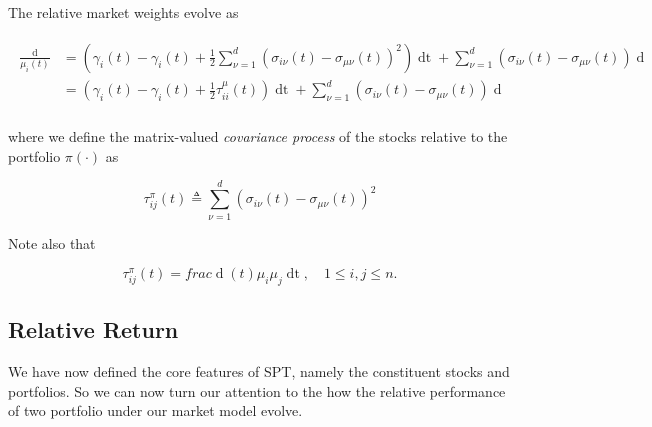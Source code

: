 \documentclass[british]{amsart} \usepackage{lmodern}
\numberwithin{equation}{section} \numberwithin{figure}{section}
\theoremstyle{plain} \newtheorem{thm}{\protect\theoremname}[section]
\theoremstyle{definition} \newtheorem{defn}[thm]{\protect\definitionname}
\theoremstyle{plain} \newtheorem{assumption}[thm]{\protect\assumptionname}
\theoremstyle{plain} \newtheorem{lem}[thm]{\protect\lemmaname}
\theoremstyle{plain} \newtheorem{prop}[thm]{\protect\propositionname}
\theoremstyle{remark} \newtheorem{rem}[thm]{\protect\remarkname}
\theoremstyle{plain} \newtheorem{cor}[thm]{\protect\corollaryname}
\renewcommand{\d}[1]{\mathop{\mathrm{d}{#1}}}
\newcommand{\defeq}{\mathop{\triangleq}} \newcommand{\almostsurely}{\text{a.s.}}
\begin{document}
The relative market weights evolve as

  \begin{gather} 
    \label{eq:relativemarketweights}
    \begin{split} 
      \frac{\d{\mu_{i}(t)}}{\mu_{i}(t)} &=
        \left(
         \gamma_{i}(t) - \gamma_{i}(t) + \frac{1}{2} 
            \sum_{\nu=1}^{d}
            \left(
              \sigma_{i\nu}(t) - \sigma_{\mu\nu}(t)
            \right) ^ 2
        \right) \d{t} + 
        \sum_{\nu=1}^{d}
        \left(
          \sigma_{i\nu}(t) - \sigma_{\mu\nu}(t)
        \right) \d{W_{\nu}(t)}  \\
        &=
        \left(
         \gamma_{i}(t) - \gamma_{i}(t) + \frac{1}{2} \tau_{ii}^{\mu}(t)
        \right) \d{t} + 
        \sum_{\nu=1}^{d}
        \left(
          \sigma_{i\nu}(t) - \sigma_{\mu\nu}(t)
        \right) \d{W_{\nu}(t)}  \\
    \end{split}
  \end{gather}

where we define the matrix-valued \textit{covariance process} of the stocks
relative to the portfolio $\pi(\cdot)$ as

\begin{equation}
  \label{eq:deftau}
  \tau_{ij}^{\pi}(t) \defeq         
            \sum_{\nu=1}^{d}
            \left(
              \sigma_{i\nu}(t) - \sigma_{\mu\nu}(t)
            \right) ^ 2
\end{equation}

Note also that

\begin{equation}
  \label{eq:tau}
  \tau_{ij}^{\pi}(t) = 
    frac{ \d{\langle \mu_{i}, \mu_{j} \rangle}(t)}{ \mu_{i} \mu_{j}}\d{t},
    \quad 1 \le i,j \le n.
\end{equation}


\subsection{Relative Return}

We have now defined the core features of SPT, namely the constituent stocks and
portfolios. So we can now turn our attention to the how the relative performance of
two portfolio under our market model evolve.
\end{document}
